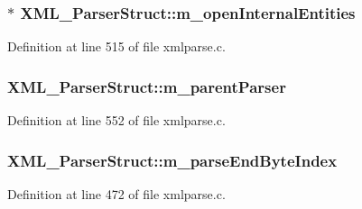 \subsubsection[{\texorpdfstring{m\+\_\+open\+Internal\+Entities}{m_openInternalEntities}}]{$\ast$ X\+M\+L\+\_\+\+Parser\+Struct\+::m\+\_\+open\+Internal\+Entities}\hypertarget{struct_x_m_l___parser_struct_a9bc8d391b98a1ad49bbe3690897e6564}{}\label{struct_x_m_l___parser_struct_a9bc8d391b98a1ad49bbe3690897e6564}


Definition at line 515 of file xmlparse.\+c.

\subsubsection[{\texorpdfstring{m\+\_\+parent\+Parser}{m_parentParser}}]{ X\+M\+L\+\_\+\+Parser\+Struct\+::m\+\_\+parent\+Parser}\hypertarget{struct_x_m_l___parser_struct_a505badae81b5b219bcf6fffff0cb2765}{}\label{struct_x_m_l___parser_struct_a505badae81b5b219bcf6fffff0cb2765}


Definition at line 552 of file xmlparse.\+c.

\subsubsection[{\texorpdfstring{m\+\_\+parse\+End\+Byte\+Index}{m_parseEndByteIndex}}]{ X\+M\+L\+\_\+\+Parser\+Struct\+::m\+\_\+parse\+End\+Byte\+Index}\hypertarget{struct_x_m_l___parser_struct_a705969e02cb294b8515a3d8f3d364e0c}{}\label{struct_x_m_l___parser_struct_a705969e02cb294b8515a3d8f3d364e0c}


Definition at line 472 of file xmlparse.\+c.

